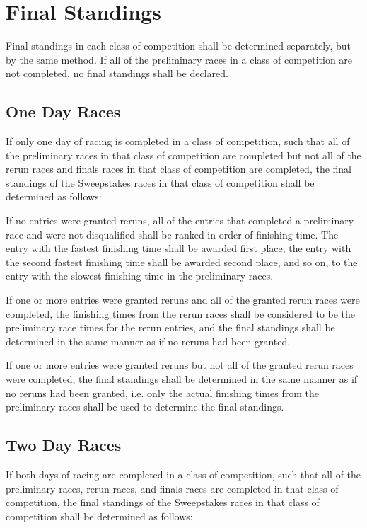 \section{Final Standings}

Final standings in each class of competition shall be determined separately, but by the same method. If all of the preliminary races in a class of competition are not completed, no final standings shall be declared.

\subsection{One Day Races}

If only one day of racing is completed in a class of competition, such that all of the preliminary races in that class of competition are completed but not all of the rerun races and finals races in that class of competition are completed, the final standings of the Sweepstakes races in that class of competition shall be determined as follows:

If no entries were granted reruns, all of the entries that completed a preliminary race and were not disqualified shall be ranked in order of finishing time. The entry with the fastest finishing time shall be awarded first place, the entry with the second fastest finishing time shall be awarded second place, and so on, to the entry with the slowest finishing time in the preliminary races.

If one or more entries were granted reruns and all of the granted rerun races were completed, the finishing times from the rerun races shall be considered to be the preliminary race times for the rerun entries, and the final standings shall be determined in the same manner as if no reruns had been granted.

If one or more entries were granted reruns but not all of the granted rerun races were completed, the final standings shall be determined in the same manner as if no reruns had been granted, i.e. only the actual finishing times from the preliminary races shall be used to determine the final standings.

\subsection{Two Day Races}

If both days of racing are completed in a class of competition, such that all of the preliminary races, rerun races, and finals races are completed in that class of competition, the final standings of the Sweepstakes races in that class of competition shall be determined as follows:

